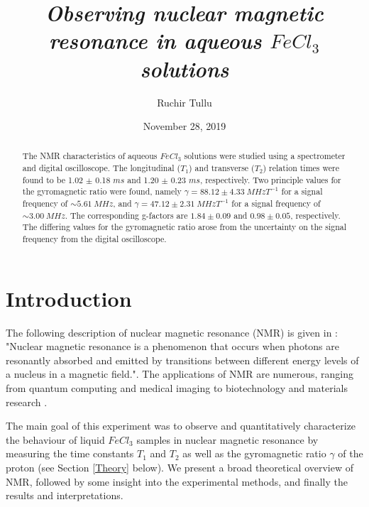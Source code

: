 \documentclass[a4paper, 12pt]{article}  %
\begin{document}
\title{\textit{Observing nuclear magnetic resonance in aqueous $FeCl_3$ solutions}}
\author{Ruchir Tullu }  %
\date{November 28, 2019} %

\maketitle

\begin{abstract}
    The NMR characteristics of aqueous $FeCl_3$ solutions were studied using a spectrometer and digital oscilloscope. The longitudinal ($T_1$) and transverse ($T_2$) relation times were found to be 1.02 $\pm$ 0.18 $ms$ and 1.20 $\pm$ 0.23 $ms$, respectively. Two principle values for the gyromagnetic ratio were found, namely $\gamma = 88.12 \pm 4.33 \ MHzT^{-1}$ for a signal frequency of $\sim 5.61 \ MHz$, and $\gamma = 47.12 \pm 2.31 \ MHzT^{-1}$ for a signal frequency of $\sim 3.00 \ MHz$. The corresponding g-factors are $1.84 \pm 0.09$ and $0.98 \pm 0.05$, respectively. The differing values for the gyromagnetic ratio arose from the uncertainty on the signal frequency from the digital oscilloscope.
\end{abstract}


\section{Introduction}
The following description of nuclear magnetic resonance (NMR) is given in \cite{Lab Manual}:
"Nuclear magnetic resonance is a phenomenon that occurs when photons are resonantly absorbed and emitted by transitions between different energy levels of a nucleus in a magnetic field.". The applications of NMR are numerous, ranging from quantum computing \cite{NMR Quantum Computers-Jones2011, NMR QC-Warren} and medical imaging \cite{ACS NMR} to biotechnology and materials research \cite{Benchtop NMR}.
\newline

The main goal of this experiment was to observe and quantitatively characterize the behaviour of liquid $FeCl_3$ samples in nuclear magnetic resonance by measuring the time constants $T_1$ and $T_2$ as well as the gyromagnetic ratio $\gamma$ of the proton (see Section \ref{Theory} below). We present a broad theoretical overview of NMR, followed by some insight into the experimental methods, and finally the results and interpretations.
\end{document}
